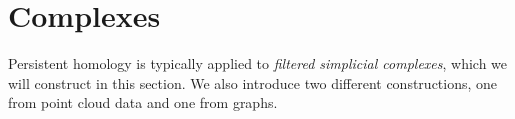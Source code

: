 \section{Complexes}

Persistent homology is typically applied to \emph{filtered simplicial complexes}, which we will construct in this section. We also introduce two different constructions, one from point cloud data and one from graphs.



